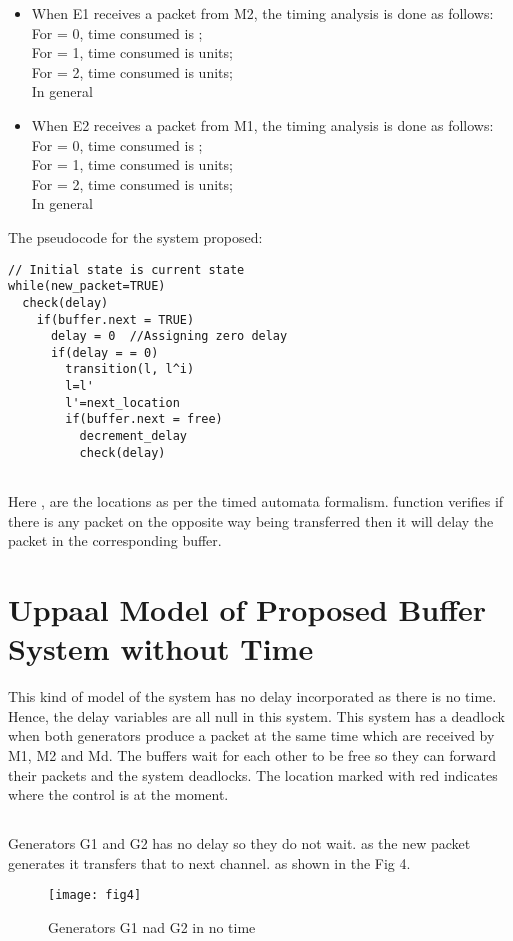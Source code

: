 \documentclass[letterpaper]{article}
\begin{document}
\begin{itemize}
\item When E1 receives a packet from M2, the timing analysis is done as follows:
\\ For  = 0, time consumed is  ;
\\For  = 1, time consumed is  units;
\\For  = 2, time consumed is  units;
\\ In general  
\item When E2 receives a packet from M1, the timing analysis is done as follows:
\\ For  = 0, time consumed is  ;
\\For  = 1, time consumed is  units;
\\For  = 2, time consumed is  units;
\\ In general 
\end{itemize}

The pseudocode for the system proposed:

\begin{verbatim} 
// Initial state is current state
while(new_packet=TRUE)
  check(delay) 
    if(buffer.next = TRUE)
      delay = 0  //Assigning zero delay
      if(delay = = 0)
        transition(l, l^i)
        l=l'
        l'=next_location
        if(buffer.next = free)
          decrement_delay
          check(delay) 
          
\end{verbatim}

Here ,  are the locations as per the timed automata formalism.  function verifies if there is any packet on the opposite way being transferred then it will delay the packet in the corresponding buffer. 



\section{Uppaal Model of Proposed  Buffer System without Time}
\label{8}
This kind of model of the system has no delay incorporated as there is no time. Hence, the delay variables are all null in this system. This system has a deadlock when both generators produce a packet at the same time which are received by M1, M2 and Md. The buffers wait for each other to be free so they can forward their packets and the system deadlocks.  The location marked with red indicates where the control is at the moment.

\subsection{} Generators G1 and G2 has no delay so they do not wait. as the new packet generates it transfers that to next channel. as shown in the Fig 4.
\begin{figure}[bpht!]
\centering
	\texttt{[image: fig4]}
		\caption{Generators G1 nad G2 in no time}
	\label{Fig 4}
\end{figure}
\end{document}
